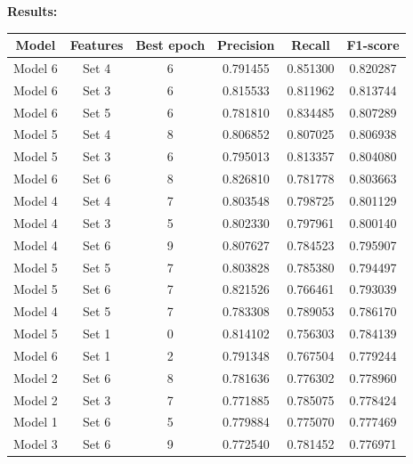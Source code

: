 \begin{table}[!h]
    \hspace{-6.6cm}\textbf{Results:}\\
    \centering
    \small
    \begin{tabular}{c|c|c|c|c|c}
        \textbf{Model} & \textbf{Features} & \textbf{Best epoch} & \textbf{Precision} & \textbf{Recall} & \textbf{F1-score} \\ \hline
        Model 6  &	Set 4      &	6	    &	0.791455    &	0.851300    &	0.820287    \\
        Model 6  &	Set 3      &	6	    &	0.815533    &	0.811962    &	0.813744    \\
        Model 6  &	Set 5      &	6	    &	0.781810    &	0.834485    &	0.807289    \\
        Model 5  &	Set 4      &	8	    &	0.806852    &	0.807025    &	0.806938    \\
        Model 5  &	Set 3      &	6	    &	0.795013    &	0.813357    &	0.804080    \\
        Model 6  &	Set 6      &	8	    &	0.826810    &	0.781778    &	0.803663    \\
        Model 4  &	Set 4      &	7	    &	0.803548    &	0.798725    &	0.801129    \\
        Model 4  &	Set 3      &	5	    &	0.802330    &	0.797961    &	0.800140    \\
        Model 4  &	Set 6      &	9	    &	0.807627    &	0.784523    &	0.795907    \\
        Model 5  &	Set 5      &	7	    &	0.803828    &	0.785380    &	0.794497    \\
        Model 5  &	Set 6      &	7	    &	0.821526    &	0.766461    &	0.793039    \\
        Model 4  &	Set 5      &	7	    &	0.783308    &	0.789053    &	0.786170    \\
        Model 5  &	Set 1      &	0	    &	0.814102    &	0.756303    &	0.784139    \\
        Model 6  &	Set 1      &	2	    &	0.791348    &	0.767504    &	0.779244    \\
        Model 2  &	Set 6      &	8	    &	0.781636    &	0.776302    &	0.778960    \\
        Model 2  &	Set 3      &	7	    &	0.771885    &	0.785075    &	0.778424    \\
        Model 1  &	Set 6      &	5	    &	0.779884    &	0.775070    &	0.777469    \\
        Model 3  &	Set 6      &	9	    &	0.772540    &	0.781452    &	0.776971    \\

\end{tabular}
\end{table}

